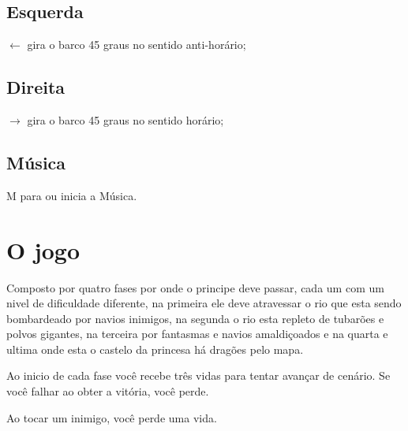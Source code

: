 \documentclass[a4paper,12pt]{article}
\begin{document}
\subsection{Esquerda}
$\leftarrow$ gira o barco 45 graus no sentido anti-horário;

\subsection{Direita}
$\rightarrow$ gira o barco 45 graus no sentido horário;

\subsection{Música}
M para ou inicia a Música.

\section {O jogo}
Composto por quatro fases por onde o principe deve passar, cada um com um nivel de dificuldade diferente, na primeira ele deve atravessar o rio que esta sendo bombardeado por navios inimigos, na segunda o rio esta repleto de tubarões e polvos gigantes, na terceira por fantasmas e navios amaldiçoados e na quarta e ultima onde esta o castelo da princesa há dragões pelo mapa.

Ao inicio de cada fase você recebe três vidas para tentar avançar de cenário. Se você falhar ao obter a vitória, você perde.

Ao tocar um inimigo, você perde uma vida.
\end{document}
